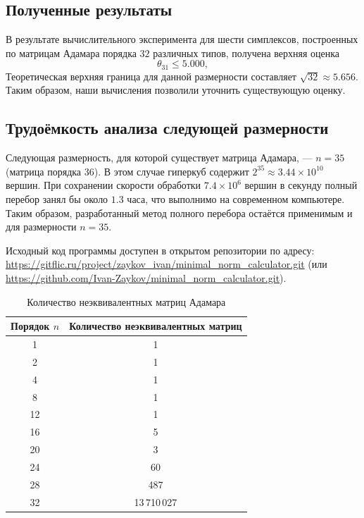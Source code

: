 \documentclass[a4paper,12pt]{article}
\theoremstyle{indented}
\begin{document}
\subsection*{Полученные результаты}

В результате вычислительного эксперимента для шести симплексов, построенных по матрицам Адамара порядка $32$ различных типов, получена верхняя оценка
\[
\theta_{31} \le 5.000,
\]
Теоретическая верхняя граница для данной размерности составляет $\sqrt{32} \approx 5.656$. Таким образом, наши вычисления позволили уточнить существующую оценку.

\subsection*{Трудоёмкость анализа следующей размерности}

Следующая размерность, для которой существует матрица Адамара, — $n = 35$ (матрица порядка $36$). В этом случае гиперкуб содержит $2^{35} \approx 3.44 \times 10^{10}$ вершин. При сохранении скорости обработки $7.4 \times 10^6$ вершин в секунду полный перебор занял бы около $1.3$ часа, что выполнимо на современном компьютере. Таким образом, разработанный метод полного перебора остаётся применимым и для размерности $n = 35$.

Исходный код программы доступен в открытом репозитории по адресу:
\url{https://gitflic.ru/project/zaykov_ivan/minimal_norm_calculator.git} (или \url{https://github.com/Ivan-Zaykov/minimal_norm_calculator.git}).


\newpage

\begin{table}[h]
\centering
\caption{Количество неэквивалентных матриц Адамара}
\label{tab:hadamard_counts}
\begin{tabular}{|c|c|}
\hline
\textbf{Порядок $n$} & \textbf{Количество неэквивалентных матриц} \\
\hline
1 & 1 \\
\hline
2 & 1 \\
\hline
4 & 1 \\
\hline
8 & 1 \\
\hline
12 & 1 \\
\hline
16 & 5 \\
\hline
20 & 3 \\
\hline
24 & 60 \\
\hline
28 & 487 \\
\hline
32 & 13\,710\,027 \\
\hline
\end{tabular}
\end{table}
\end{document}
